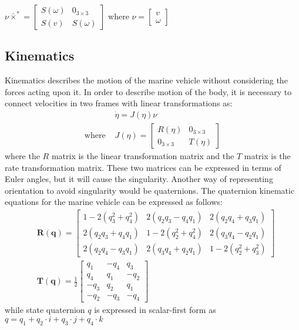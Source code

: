     $
    \nu\bar{\times}^*=\left[\begin{array}{ll}
        S(\omega) & 0_{3 \times 3} \\
        S(v) & S(\omega)
    \end{array}\right]
    $ where $\nu = \left[\begin{array}{l}
        v \\
        \omega
    \end{array}\right]$

\subsection*{Kinematics}

    Kinematics describes the motion of the marine vehicle without considering the forces acting upon it.
    In order to describe motion of the body, it is necessary to connect velocities in two frames with linear transformations as:
    $$
    \begin{aligned}
        & \dot{\eta}=J(\eta) \nu \\
        \text{where } & J(\eta)=\left[\begin{array}{cc}
        R(\eta) & 0_{3 \times 3} \\
        0_{3 \times 3} & T(\eta)
        \end{array}\right]
    \end{aligned}
    $$
    where the $R$ matrix is the linear transformation matrix and the $T$ matrix is the rate transformation matrix. 
    These two matrices can be expressed in terms of Euler angles, but it will cause the singularity. 
    Another way of representing orientation to avoid singularity would be quaternions.
    The quaternion kinematic equations for the marine vehicle can be expressed as follows:
    $$
    \begin{aligned}
    & \boldsymbol{R}(\boldsymbol{q})=\left[\begin{array}{ccc}
        1-2\left(q_3^2+q_4^2\right) & 2\left(q_2 q_3-q_4 q_1\right) & 2\left(q_2 q_4+q_3 q_1\right) \\
        2\left(q_2 q_3+q_4 q_1\right) & 1-2\left(q_2^2+q_4^2\right) & 2\left(q_3 q_4-q_2 q_1\right) \\
        2\left(q_2 q_4-q_3 q_1\right) & 2\left(q_3 q_4+q_2 q_1\right) & 1-2\left(q_2^2+q_3^2\right)
        \end{array}\right]\\
    & \boldsymbol{T}(\boldsymbol{q})=\frac{1}{2}\left[\begin{array}{rrr}
        q_1 & -q_4 & q_3 \\
        q_4 & q_1 & -q_2 \\
        -q_3 & q_2 & q_1 \\
        -q_2 & -q_3 & -q_4
        \end{array}\right]
    \end{aligned}
    $$
    while state quaternion $q$ is expressed in scalar-first form as 
    $q = q_1 + q_2\cdot i + q_3\cdot j + q_4\cdot k$

